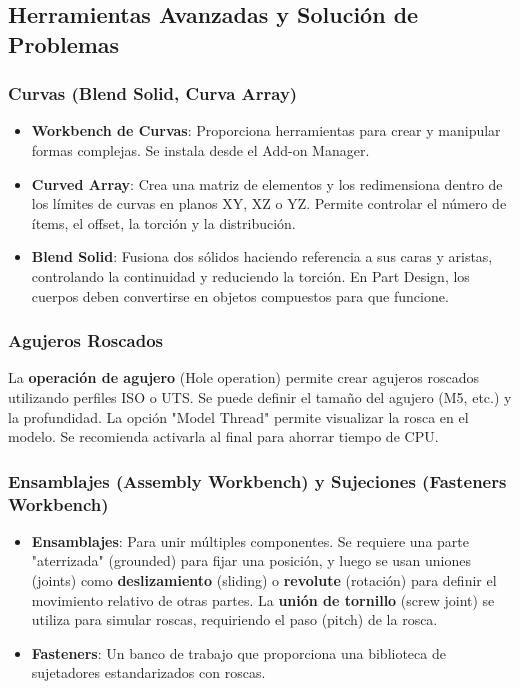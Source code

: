 \documentclass{article}
\begin{document}
\subsection*{Herramientas Avanzadas y Solución de Problemas}

\subsubsection*{Curvas (Blend Solid, Curva Array)}
\begin{itemize}[noitemsep,topsep=0pt]
    \item \textbf{Workbench de Curvas}: Proporciona herramientas para crear y manipular formas complejas. Se instala desde el Add-on Manager.
    \item \textbf{Curved Array}: Crea una matriz de elementos y los redimensiona dentro de los límites de curvas en planos XY, XZ o YZ. Permite controlar el número de ítems, el offset, la torción y la distribución.
    \item \textbf{Blend Solid}: Fusiona dos sólidos haciendo referencia a sus caras y aristas, controlando la continuidad y reduciendo la torción. En Part Design, los cuerpos deben convertirse en objetos compuestos para que funcione.
\end{itemize}

\subsubsection*{Agujeros Roscados}
La \textbf{operación de agujero} (Hole operation) permite crear agujeros roscados utilizando perfiles ISO o UTS. Se puede definir el tamaño del agujero (M5, etc.) y la profundidad. La opción "Model Thread" permite visualizar la rosca en el modelo. Se recomienda activarla al final para ahorrar tiempo de CPU.

\subsubsection*{Ensamblajes (Assembly Workbench) y Sujeciones (Fasteners Workbench)}
\begin{itemize}[noitemsep,topsep=0pt]
    \item \textbf{Ensamblajes}: Para unir múltiples componentes. Se requiere una parte "aterrizada" (grounded) para fijar una posición, y luego se usan uniones (joints) como \textbf{deslizamiento} (sliding) o \textbf{revolute} (rotación) para definir el movimiento relativo de otras partes. La \textbf{unión de tornillo} (screw joint) se utiliza para simular roscas, requiriendo el paso (pitch) de la rosca.
    \item \textbf{Fasteners}: Un banco de trabajo que proporciona una biblioteca de sujetadores estandarizados con roscas.
\end{itemize}
\end{document}
